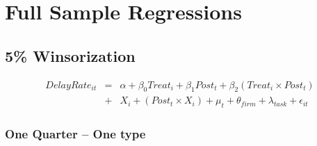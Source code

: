 \documentclass[
]{article}
\begin{document}
\hypertarget{full-sample-regressions}{%
\section{Full Sample Regressions}\label{full-sample-regressions}}

\hypertarget{winsorization}{%
\subsection{5\% Winsorization}\label{winsorization}}

\[ \begin{aligned} DelayRate_{it} &=& \alpha+\beta_0 Treat_i + \beta_1 Post_t + \beta_2 (Treat_i \times Post_t)\\
&+&  X_i + (Post_t \times X_i) + \mu_t + \theta_{firm} + \lambda_{task}+ \epsilon_{it}
\end{aligned}\]

\hypertarget{one-quarter-one-type}{%
\subsubsection{One Quarter -- One type}\label{one-quarter-one-type}}
\end{document}
